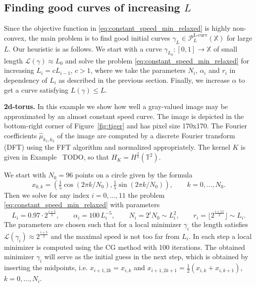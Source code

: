 \documentclass[draft,
a4paper,11pt,DIV=11,%
abstract=on%
]{scrartcl}
\DeclareMathOperator{\Lcurve}{L-curv}
\begin{document}
\subsection{Finding good curves of increasing $L$}

Since the objective function in \eqref{eq:constant_speed_min_relaxed} is highly non-convex, the main problem is to find good initial curves $\gamma_{L} \in  \mathcal P_{L}^{\Lcurve}(\mathbb X)$ for large $L$. Our heuristic is as follows. We start with a curve $\gamma_{L_{0}}:[0,1]\to \mathbb X$ of small length $\mathcal L(\gamma) \approx L_{0}$ and solve the problem \eqref{eq:constant_speed_min_relaxed} for increasing $L_{i} = c L_{i-1}$, $c>1$, where we take the parameters $N_{i}$, $\alpha_{i}$ and $r_{i}$ in dependency of $L_{i}$ as described in the previous section. Finally, we increase $\alpha$ to get a curve satisfying $L(\gamma) \le L$. 

\textbf{2d-torus.}
In this example we show how well a gray-valued image may be approximated by an almost constant speed curve. The image is depicted in the bottom-right corner of Figure~\ref{fig:tiger} and has pixel size 170x170. The Fourier coefficients $\hat \mu_{k_{1},k_{2}}$ of the image are computed by a discrete Fourier transform (DFT) using the FFT algorithm and normalized appropriately. The kernel $K$ is given in Example~{\color{blue} TODO}, so that $H_{K} = H^{\frac32}(\mathbb T^{2})$.

We start with $N_{0}=96$ points on a circle given by the formula
\[
  x_{0,k} = ( \tfrac15 \cos(2\pi k/N_{0}), \tfrac15 \sin(2\pi k/N_{0})), \qquad k=0,\dots,N_{0}.
\]
Then we solve for any index $i=0,\dots,11$ the problem \eqref{eq:constant_speed_min_relaxed} with parameters
\[
  L_{i} = 0.97\cdot 2^{\frac{i+5}{2}},\qquad \alpha_{i} = 100\,L_{i}^{-5},\qquad N_{i} = 2^{i} N_{0} \sim L_{i}^{2}, \qquad r_{i}= \lfloor 2^{\frac{i+11}{2}} \rfloor \sim L_{i}.
\]
The parameters are chosen such that
for a local minimizer $\gamma_{i}$ the length satisfies $\mathcal L(\gamma_{i}) \approx 2^{\frac{i+5}{2}}$ and the maximal speed is not too far from $L_{i}$. In each step a local minimizer is computed using the CG method with 100 iterations. The obtained minimizer $\gamma_{i}$ will serve as the initial guess in the next step, which is obtained by inserting the midpoints, i.e. $x_{i+1,2k}=x_{i,k}$ and $x_{i+1,2k+1} = \frac{1}{2}(x_{i,k}+ x_{i,k+1})$, $k=0,\dots,N_{i}$. 
\end{document}
